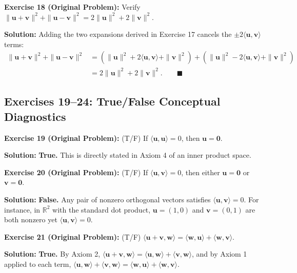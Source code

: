 \documentclass[11pt, letterpaper]{article}
\theoremstyle{definition}
\theoremstyle{remark}
\begin{document}
\textbf{Exercise 18 (Original Problem):} Verify $\|\mathbf{u} + \mathbf{v}\|^2 + \|\mathbf{u} - \mathbf{v}\|^2 = 2\|\mathbf{u}\|^2 + 2\|\mathbf{v}\|^2$.

\textbf{Solution:}
Adding the two expansions derived in Exercise 17 cancels the $\pm 2\langle \mathbf{u}, \mathbf{v} \rangle$ terms:
\begin{align*}
    \|\mathbf{u} + \mathbf{v}\|^2 + \|\mathbf{u} - \mathbf{v}\|^2 &= \left(\|\mathbf{u}\|^2 + 2\langle \mathbf{u}, \mathbf{v} \rangle + \|\mathbf{v}\|^2\right) + \left(\|\mathbf{u}\|^2 - 2\langle \mathbf{u}, \mathbf{v} \rangle + \|\mathbf{v}\|^2\right) \\
    &= 2\|\mathbf{u}\|^2 + 2\|\mathbf{v}\|^2. \qquad \blacksquare
\end{align*}

\subsection{Exercises 19--24: True/False Conceptual Diagnostics}

\textbf{Exercise 19 (Original Problem):} (T/F) If $\langle \mathbf{u}, \mathbf{u} \rangle = 0$, then $\mathbf{u} = \mathbf{0}$.

\textbf{Solution:} \textbf{True.} This is directly stated in Axiom 4 of an inner product space.

\textbf{Exercise 20 (Original Problem):} (T/F) If $\langle \mathbf{u}, \mathbf{v} \rangle = 0$, then either $\mathbf{u} = \mathbf{0}$ or $\mathbf{v} = \mathbf{0}$.

\textbf{Solution:} \textbf{False.} Any pair of nonzero orthogonal vectors satisfies $\langle \mathbf{u}, \mathbf{v} \rangle = 0$. For instance, in $\mathbb{R}^2$ with the standard dot product, $\mathbf{u} = (1, 0)$ and $\mathbf{v} = (0, 1)$ are both nonzero yet $\langle \mathbf{u}, \mathbf{v} \rangle = 0$.

\textbf{Exercise 21 (Original Problem):} (T/F) $\langle \mathbf{u} + \mathbf{v}, \mathbf{w} \rangle = \langle \mathbf{w}, \mathbf{u} \rangle + \langle \mathbf{w}, \mathbf{v} \rangle$.

\textbf{Solution:} \textbf{True.} By Axiom 2, $\langle \mathbf{u} + \mathbf{v}, \mathbf{w} \rangle = \langle \mathbf{u}, \mathbf{w} \rangle + \langle \mathbf{v}, \mathbf{w} \rangle$, and by Axiom 1 applied to each term, $\langle \mathbf{u}, \mathbf{w} \rangle + \langle \mathbf{v}, \mathbf{w} \rangle = \langle \mathbf{w}, \mathbf{u} \rangle + \langle \mathbf{w}, \mathbf{v} \rangle$.
\end{document}
